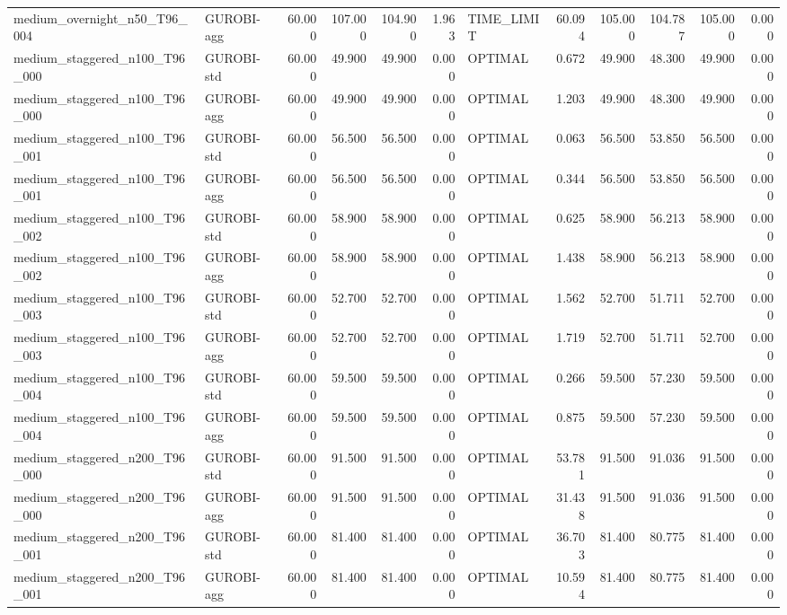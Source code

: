 \begin{table}[htbp]
\begin{tabular}{llrrrrlrrrrr}
medium\_overnight\_n50\_T96\_004 & GUROBI-agg & 60.000 & 107.000 & 104.900 & 1.963 & TIME\_LIMIT & 60.094 & 105.000 & 104.787 & 105.000 & 0.000 \\
medium\_staggered\_n100\_T96\_000 & GUROBI-std & 60.000 & 49.900 & 49.900 & 0.000 & OPTIMAL & 0.672 & 49.900 & 48.300 & 49.900 & 0.000 \\
medium\_staggered\_n100\_T96\_000 & GUROBI-agg & 60.000 & 49.900 & 49.900 & 0.000 & OPTIMAL & 1.203 & 49.900 & 48.300 & 49.900 & 0.000 \\
medium\_staggered\_n100\_T96\_001 & GUROBI-std & 60.000 & 56.500 & 56.500 & 0.000 & OPTIMAL & 0.063 & 56.500 & 53.850 & 56.500 & 0.000 \\
medium\_staggered\_n100\_T96\_001 & GUROBI-agg & 60.000 & 56.500 & 56.500 & 0.000 & OPTIMAL & 0.344 & 56.500 & 53.850 & 56.500 & 0.000 \\
medium\_staggered\_n100\_T96\_002 & GUROBI-std & 60.000 & 58.900 & 58.900 & 0.000 & OPTIMAL & 0.625 & 58.900 & 56.213 & 58.900 & 0.000 \\
medium\_staggered\_n100\_T96\_002 & GUROBI-agg & 60.000 & 58.900 & 58.900 & 0.000 & OPTIMAL & 1.438 & 58.900 & 56.213 & 58.900 & 0.000 \\
medium\_staggered\_n100\_T96\_003 & GUROBI-std & 60.000 & 52.700 & 52.700 & 0.000 & OPTIMAL & 1.562 & 52.700 & 51.711 & 52.700 & 0.000 \\
medium\_staggered\_n100\_T96\_003 & GUROBI-agg & 60.000 & 52.700 & 52.700 & 0.000 & OPTIMAL & 1.719 & 52.700 & 51.711 & 52.700 & 0.000 \\
medium\_staggered\_n100\_T96\_004 & GUROBI-std & 60.000 & 59.500 & 59.500 & 0.000 & OPTIMAL & 0.266 & 59.500 & 57.230 & 59.500 & 0.000 \\
medium\_staggered\_n100\_T96\_004 & GUROBI-agg & 60.000 & 59.500 & 59.500 & 0.000 & OPTIMAL & 0.875 & 59.500 & 57.230 & 59.500 & 0.000 \\
medium\_staggered\_n200\_T96\_000 & GUROBI-std & 60.000 & 91.500 & 91.500 & 0.000 & OPTIMAL & 53.781 & 91.500 & 91.036 & 91.500 & 0.000 \\
medium\_staggered\_n200\_T96\_000 & GUROBI-agg & 60.000 & 91.500 & 91.500 & 0.000 & OPTIMAL & 31.438 & 91.500 & 91.036 & 91.500 & 0.000 \\
medium\_staggered\_n200\_T96\_001 & GUROBI-std & 60.000 & 81.400 & 81.400 & 0.000 & OPTIMAL & 36.703 & 81.400 & 80.775 & 81.400 & 0.000 \\
medium\_staggered\_n200\_T96\_001 & GUROBI-agg & 60.000 & 81.400 & 81.400 & 0.000 & OPTIMAL & 10.594 & 81.400 & 80.775 & 81.400 & 0.000 \\

\end{tabular}
\end{table}
